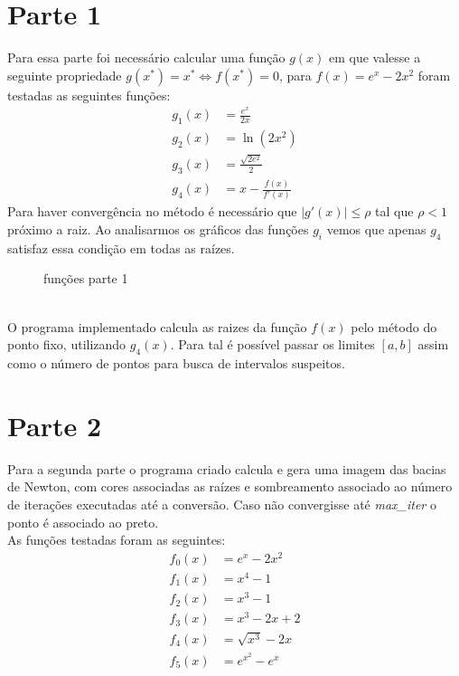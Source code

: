 \documentclass[12pt, a4paper]{article}
\begin{document}
\section*{Parte 1}
    Para essa parte foi necessário calcular uma função $g(x)$ em que valesse
    a seguinte propriedade $g(x^*) = x^* \iff f(x^*) = 0$, para $f(x) = e^x - 2x^2$
    foram testadas as seguintes funções:
    \begin{align*}
        g_{1}(x) &= \frac{e^x}{2x}\\
        g_{2}(x) &= \ln(2x^2)\\
        g_{3}(x) &= \frac{\sqrt{2e^2}}{2}\\
        g_{4}(x) &= x - \frac{f(x)}{f'(x)}
    \end{align*}
    Para haver convergência no método é necessário que $|g'(x)| \leq \rho$ tal que
    $\rho < 1$ próximo a raiz. Ao analisarmos os gráficos das funções $g_i$ vemos
    que apenas $g_{4}$ satisfaz essa condição em todas as raízes.\\
    \begin{figure}[h]
        \centering
        \caption{funções parte 1}
    \end{figure}\\
    O programa implementado calcula as raizes da função $f(x)$ pelo método do ponto
    fixo, utilizando $g_{4}(x)$. Para tal é possível passar os limites $[a, b]$
    assim como o número de pontos para busca de intervalos suspeitos.\\

\section*{Parte 2}
    Para a segunda parte o programa criado calcula e gera uma imagem das bacias
    de Newton, com cores associadas as raízes e sombreamento associado ao número
    de iterações executadas até a conversão. Caso não convergisse até \emph{max\_iter}
    o ponto é associado ao preto.\\
    As funções testadas foram as seguintes:
    \begin{align*}
        f_{0}(x) &= e^{x} - 2x^2\\
        f_{1}(x) &= x^4 - 1\\
        f_{2}(x) &= x^3 - 1\\
        f_{3}(x) &= x^3 - 2x + 2\\
        f_{4}(x) &= \sqrt{x^3} - 2x\\
        f_{5}(x) &= e^{x^2} - e^{x}
    \end{align*}
\end{document}
